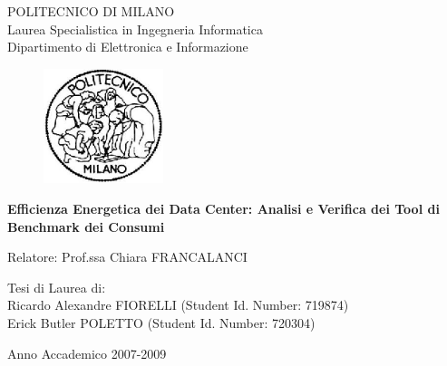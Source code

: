 \begin{titlepage}
\vspace*{-1.5cm}
\bfseries{
\begin{center}
  \large POLITECNICO DI MILANO\\
  
  \normalsize Laurea Specialistica in Ingegneria Informatica\\
              Dipartimento di Elettronica e Informazione\\
  
  \vspace{1cm}
  
  \begin{figure}[htbp]
  \centering
  \includegraphics[width=3.5cm]{graphics/logopoli}
  \end{figure}
  
  \vspace*{0.3cm} \LARGE

  \textbf{Efficienza Energetica dei Data Center: Analisi e Verifica dei Tool di Benchmark dei Consumi}\\
    
\end{center}

\vspace*{1.5cm} \large

\begin{flushleft}
  Relatore: Prof.ssa Chiara FRANCALANCI
\end{flushleft}

\vspace*{1.6cm}

\begin{flushright}
  Tesi di Laurea di:\\ 
  Ricardo Alexandre FIORELLI (Student Id. Number: 719874)\\
  Erick Butler POLETTO (Student Id. Number: 720304)\\
\end{flushright}

\vspace*{1.0cm}

\begin{center}
  Anno Accademico 2007-2009
\end{center} 
}
\end{titlepage}
